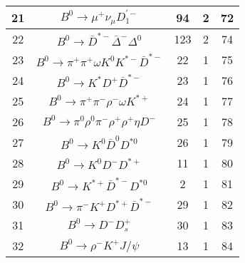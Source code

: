 \documentclass[landscape]{article}
\begin{document}
\begin{table}[htbp!]
\begin{tabular}{|c|c|c|c|c|}
\hline
21 & $ B^{0} \rightarrow \mu^{+} \nu_{\mu} D_{1}^{\prime-} $ & 94 & 2 & 72 \\
\hline
22 & $ B^{0} \rightarrow \bar{D}^{*-} \bar{\Delta}^{-} \Delta^{0} $ & 123 & 2 & 74 \\
\hline
23 & $ B^{0} \rightarrow \pi^{+} \pi^{+} \omega K^{0} K^{*-} \bar{D}^{*-} $ & 22 & 1 & 75 \\
\hline
24 & $ B^{0} \rightarrow K^{*} D^{+} \bar{D}^{*-} $ & 23 & 1 & 76 \\
\hline
25 & $ B^{0} \rightarrow \pi^{+} \pi^{-} \rho^{-} \omega K^{*+} $ & 24 & 1 & 77 \\
\hline
26 & $ B^{0} \rightarrow \pi^{0} \rho^{0} \pi^{-} \rho^{+} \rho^{+} \eta D^{-} $ & 25 & 1 & 78 \\
\hline
27 & $ B^{0} \rightarrow K^{0} \bar{D}^{0} D^{*0} $ & 26 & 1 & 79 \\
\hline
28 & $ B^{0} \rightarrow K^{0} D^{-} D^{*+} $ & 11 & 1 & 80 \\
\hline
29 & $ B^{0} \rightarrow K^{*+} \bar{D}^{*-} D^{*0} $ & 2 & 1 & 81 \\
\hline
30 & $ B^{0} \rightarrow \pi^{-} K^{+} D^{*+} \bar{D}^{*-} $ & 29 & 1 & 82 \\
\hline
31 & $ B^{0} \rightarrow D^{-} D_{s}^{+} $ & 30 & 1 & 83 \\
\hline
32 & $ B^{0} \rightarrow \rho^{-} K^{+} J/\psi $ & 13 & 1 & 84 \\
\hline
\end{tabular}
\end{table}

\clearpage
\end{document}
